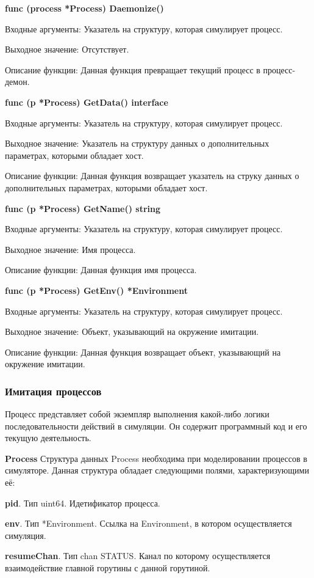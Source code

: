 \textbf{func (process *Process) Daemonize() }

Входные аргументы: Указатель на структуру, которая симулирует процесс.

Выходное значение: Отсутствует.

Описание функции: Данная функция превращает текущий процесс в процесс-демон.


\textbf{func (p *Process) GetData() interface}

Входные аргументы: Указатель на структуру, которая симулирует процесс.

Выходное значение: Указатель на структуру данных о дополнительных параметрах, которыми обладает хост.

Описание функции: Данная функция возвращает указатель на струку данных о дополнительных параметрах, которыми обладает хост.


\textbf{func (p *Process) GetName() string}

Входные аргументы: Указатель на структуру, которая симулирует процесс.

Выходное значение: Имя процесса.

Описание функции: Данная функция имя процесса.

\textbf{func (p *Process) GetEnv() *Environment}

Входные аргументы: Указатель на структуру, которая симулирует процесс.

Выходное значение: Объект, указывающий на окружение имитации.

Описание функции: Данная функция возвращает объект, указывающий на окружение имитации.

\subsubsection{Имитация процессов}
\par 
Процесс представляет собой экземпляр выполнения какой-либо логики последовательности действий в симуляции. Он содержит программный код и его текущую деятельность.


\textbf{Process}
Структура данных Process необходима при моделировании процессов в симуляторе. Данная структура обладает следующими полями, характеризующими  её:

\textbf{	pid}. Тип uint64. Идетификатор процесса. 

\textbf{	env}. Тип        *Environment. Ссылка на Environment, в котором осуществляется симуляция. 

\textbf{	resumeChan}. Тип chan STATUS. Канал по которому осуществляется взаимодействие главной горутины с данной горутиной. 

